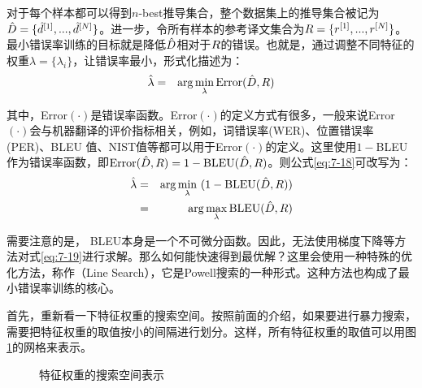\parinterval 对于每个样本都可以得到$n$-best推导集合，整个数据集上的推导集合被记为$\hat{{D}} = \{\hat{{d}}^{[1]},...,\hat{{d}}^{[N]}\}$。进一步，令所有样本的参考译文集合为${R} = \{{r}^{[1]},...,{r}^{[N]}\}$。最小错误率训练的目标就是降低$\hat{{D}}$相对于${R}$的错误。也就是，通过调整不同特征的权重$\lambda = \{ \lambda_i \}$，让错误率最小，形式化描述为：
\begin{eqnarray}
\hat{\lambda} & = & \arg\min_{\lambda} \textrm{Error}(\hat{{D}},{R})
\label{eq:7-18}
\end{eqnarray}

\noindent 其中，\textrm{Error}$(\cdot)$是错误率函数。\textrm{Error}$(\cdot)$的定义方式有很多，一般来说\textrm{Error}$(\cdot)$会与机器翻译的评价指标相关，例如，词错误率(WER)、位置错误率(PER)、BLEU 值、NIST值等都可以用于\textrm{Error}$(\cdot)$的定义。这里使用$1-$BLEU作为错误率函数，即$\textrm{Error}(\hat{{D}},{R}) = 1 - \textrm{BLEU}(\hat{{D}},{R})$。则公式\eqref{eq:7-18}可改写为：
\begin{eqnarray}
\hat{\lambda} &=& \arg\min_{\lambda}\ (1 - \textrm{BLEU}(\hat{{D}},{R}))   \nonumber \\
&=& \arg\max_{\lambda} \textrm{BLEU}(\hat{{D}},{R})
\label{eq:7-19}
\end{eqnarray}

\parinterval 需要注意的是， BLEU本身是一个不可微分函数。因此，无法使用梯度下降等方法对式\eqref{eq:7-19}进行求解。那么如何能快速得到最优解？这里会使用一种特殊的优化方法，称作{\small{}}（Line Search），它是Powell搜索的一种形式。这种方法也构成了最小错误率训练的核心。

\parinterval 首先，重新看一下特征权重的搜索空间。按照前面的介绍，如果要进行暴力搜索，需要把特征权重的取值按小的间隔进行划分。这样，所有特征权重的取值可以用图\ref{fig:7-23}的网格来表示。

\begin{figure}[htp]
\centering

\caption{特征权重的搜索空间表示}
\label{fig:7-23}
\end{figure}

